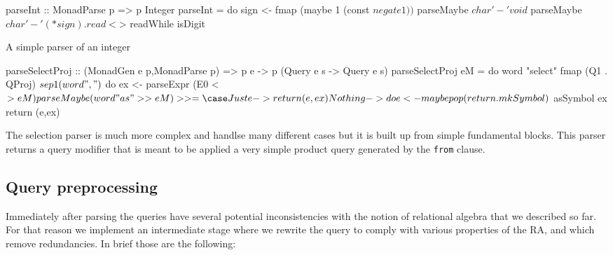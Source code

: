 \begin{listing}[p]
  \begin{haskell}
    parseInt :: MonadParse p => p Integer
    parseInt = do
    sign <- fmap (maybe 1 (const $ negate 1)) $ parseMaybe $ char '-'
    void $ parseMaybe $ char '-'
    (* sign) . read <$> readWhile isDigit
  \end{haskell}
  \caption{\label{org463a483}A simple parser of an integer}
\end{listing}

\begin{listing}[p]
  \begin{haskell}
    parseSelectProj
    :: (MonadGen e p,MonadParse p) => p e -> p (Query e s -> Query e s)
    parseSelectProj eM = do
    word "select"
    fmap (Q1 . QProj) $ sep1 (word ",") $ do
    ex <- parseExpr (E0 <$> eM)
    parseMaybe (word "as" >> eM) >>= \case
    Just e -> return (e,ex)
    Nothing -> do
    e <- maybe pop (return . mkSymbol) $ asSymbol ex
    return (e,ex)
  \end{haskell}
  \caption{\label{org39b9e41}The selection parser is much more complex and handlse many different cases but it is built up from simple fundamental blocks. This parser returns a query modifier that is meant to be applied a very simple product query generated by the \texttt{from} clause.}
\end{listing}
\subsection{Query preprocessing}
\label{sec:orgd903905}
Immediately after parsing the queries have several potential
inconsistencies with the notion of relational algebra that we
described so far. For that reason we implement an intermediate stage
where we rewrite the query to comply with various properties of the
RA, and which remove redundancies. In brief those are the following:

